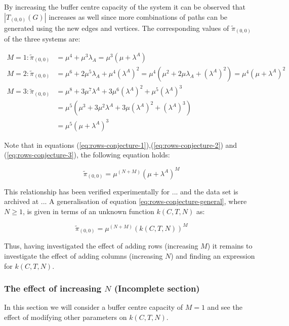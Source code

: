 By increasing the buffer centre capacity of the system it can be observed that 
\(|T_{(0,0)}(G)|\) increases as well since more combinations of paths can be 
generated using the new edges and vertices. 
The corresponding values of \(\tilde{\pi}_{(0,0)}\) of the three systems are:

\begin{align}
    M = 1: \tilde{\pi}_{(0,0)} &= \mu^4 + \mu^3 \lambda_A = 
    \mu^3 (\mu + \lambda^A) \label{eq:rows-conjecture-1}\\
    M = 2: \tilde{\pi}_{(0,0)} &= \mu^6 + 2\mu^5 \lambda_A + \mu^4 (\lambda^A)^2 
    = \mu^4(\mu^2 + 2\mu \lambda_A + (\lambda^A)^2) 
    = \mu^4 (\mu + \lambda^A) ^ 2 \label{eq:rows-conjecture-2}\\
    M = 3: \tilde{\pi}_{(0,0)} &= \mu^8 + 3 \mu^7 \lambda^A + 
    3 \mu^6 (\lambda^A)^2 + \mu^5(\lambda^A)^3 \nonumber \\
    &= \mu^5 (\mu^3 + 3 \mu ^2 \lambda^A + 3 \mu (\lambda^A)^2 + (\lambda^A)^3) 
    \nonumber \\
    &= \mu^5 (\mu + \lambda^A) ^ 3 \label{eq:rows-conjecture-3}
\end{align}

Note that in equations (\ref{eq:rows-conjecture-1}),(\ref{eq:rows-conjecture-2}) 
and (\ref{eq:rows-conjecture-3}), the following equation holds: 

\begin{equation}\label{eq:rows-conjecture-general}
    \tilde{\pi}_{(0,0)} = \mu^{(N+M)} (\mu + \lambda^A)^M
\end{equation}

This relationship has been verified experimentally for ... and the data set is 
archived at ... 
A generalisation of equation \ref{eq:rows-conjecture-general}, where \(N \geq 1\), 
is given in terms of an unknown function \(k(C,T,N)\) as:

\begin{equation}
    \tilde{\pi}_{(0,0)} = \mu^{(N+M)} (k(C,T,N))^M
\end{equation}

Thus, having investigated the effect of adding rows (increasing \(M\)) it remains 
to investigate the effect of adding columns (increasing \(N\)) and finding an 
expression for \(k(C,T,N)\).

\subsubsection{The effect of increasing \(N\) (Incomplete section)}
In this section we will consider a buffer centre capacity of \(M=1\) and see the 
effect 
of modifying other parameters on \(k(C, T, N)\).

